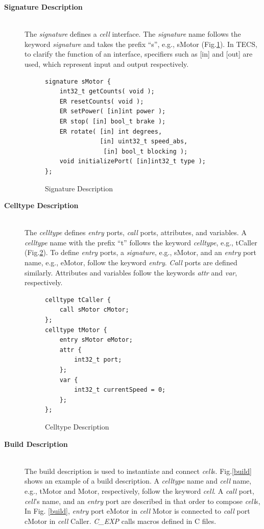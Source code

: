 \documentclass[conference]{IEEEtran/IEEEtran}
\begin{document}
\begin{description}
    \item[{\bf Signature Description}]\mbox{}\\
        The {\it signature} defines a {\it cell} interface.
        The {\it signature} name follows the keyword {\it signature} and takes the prefix ``s'', e.g., sMotor (Fig.\ref{signature}).
        In TECS, to clarify the function of an interface, specifiers such as [in] and [out] are used, which represent input and output respectively.
\begin{figure}[t]
\centering
\begin{lstlisting}
signature sMotor {
    int32_t getCounts( void );
    ER resetCounts( void );
    ER setPower( [in]int power );
    ER stop( [in] bool_t brake );
    ER rotate( [in] int degrees,
               [in] uint32_t speed_abs,
                [in] bool_t blocking );
    void initializePort( [in]int32_t type );
};
\end{lstlisting}
\caption{Signature Description}
\label{signature}
\end{figure}
    \item[{\bf Celltype Description}]\mbox{}\\
        The {\it celltype} defines {\it entry} ports, {\it call} ports, attributes, and variables.
        A {\it celltype} name with the prefix ``t'' follows the keyword {\it celltype}, e.g., tCaller (Fig.\ref{celltype}).
        To define {\it entry} ports, a {\it signature}, e.g., sMotor, and an {\it entry} port name, e.g., eMotor, follow the keyword {\it entry}.
        {\it Call} ports are defined similarly.
        Attributes and variables follow the keywords {\it attr} and {\it var}, respectively.
\begin{figure}[t]
\centering
\begin{lstlisting}
celltype tCaller {
    call sMotor cMotor;
};
celltype tMotor {
    entry sMotor eMotor;
    attr {
        int32_t port;
    };
    var {
        int32_t currentSpeed = 0;
    };
};
\end{lstlisting}
\caption{Celltype Description}
\label{celltype}
\end{figure}
    \item[{\bf Build Description}]\mbox{}\\
        The build description is used to instantiate and connect {\it cell}s.
        Fig.\ref{build} shows an example of a build description.
        A {\it celltype} name and {\it cell} name, e.g., tMotor and Motor, respectively, follow the keyword {\it cell}.
        A {\it call} port, {\it cell}'s name, and an {\it entry} port are described in that order to compose {\it cell}s,
        In Fig. \ref{build}, {\it entry} port eMotor in {\it cell} Motor is connected to {\it call} port cMotor in {\it cell} Caller.
        {\it C\_EXP} calls macros defined in C files.


\end{description}
\end{document}

